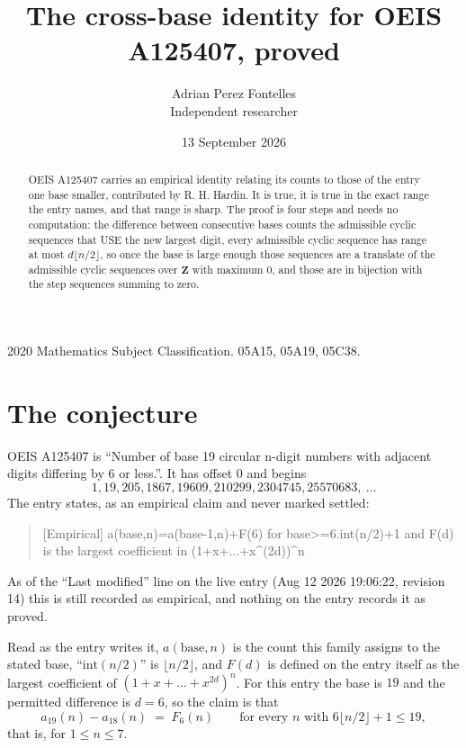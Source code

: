 \documentclass[11pt,a4paper]{article}
\title{The cross-base identity for OEIS A125407, proved}
\author{Adrian Perez Fontelles\\ \small Independent researcher}
\date{13 September 2026}
\theoremstyle{plain}
\theoremstyle{definition}
\begin{document}
\maketitle

\begin{abstract}
OEIS A125407 carries an empirical identity relating its counts to those of the entry one base
smaller, contributed by R. H. Hardin. It is true, it is true in the exact range the entry
names, and that range is sharp. The proof is four steps and needs no computation: the
difference between consecutive bases counts the admissible cyclic sequences that USE the new
largest digit, every admissible cyclic sequence has range at most $d\lfloor n/2\rfloor$, so
once the base is large enough those sequences are a translate of the admissible cyclic
sequences over $\mathbf{Z}$ with maximum $0$, and those are in bijection with the step
sequences summing to zero.
\end{abstract}

\noindent\small 2020 Mathematics Subject Classification. 05A15, 05A19, 05C38.\normalsize

\section{The conjecture}

OEIS A125407 is ``Number of base 19 circular n-digit numbers with adjacent digits differing by 6 or less.''. It has offset $0$ and begins
\[
1, 19, 205, 1867, 19609, 210299, 2304745, 25570683,\ \dots
\]
The entry states, as an empirical claim and never marked settled:
\begin{quote}
[Empirical] a(base,n)=a(base-1,n)+F(6) for base>=6.int(n/2)+1 and F(d) is the largest coefficient in (1+x+...+x\textasciicircum{}(2d))\textasciicircum{}n
\end{quote}
As of the ``Last modified'' line on the live entry (Aug 12 2026 19:06:22, revision 14)
this is still recorded as empirical, and nothing on the entry records it as proved.

Read as the entry writes it, $a(\mathrm{base},n)$ is the count this family assigns to the
stated base, ``$\mathrm{int}(n/2)$'' is $\lfloor n/2\rfloor$, and $F(d)$ is defined on the
entry itself as the largest coefficient of $(1+x+\dots+x^{2d})^{n}$. For this entry
the base is $19$ and the permitted difference is $d=6$, so the claim is that
\[
a_{19}(n)-a_{18}(n)\;=\;F_{6}(n)
\qquad\text{for every } n \text{ with } 6\lfloor n/2\rfloor+1\le19,
\]
that is, for $1\le n\le7$.
\end{document}
